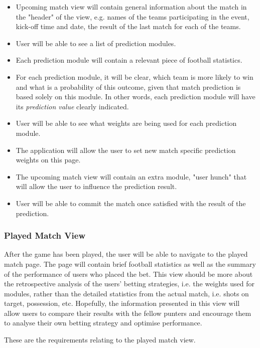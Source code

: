 \begin{itemize}
 \item Upcoming match view will contain general information about the match in the "header" of the view, e.g. names of the teams participating in the event, kick-off time and date, the result of the last match for each of the teams.
    \item User will be able to see a list of prediction modules.
    \item Each prediction module will contain a relevant piece of football statistics.
    \item For each prediction module, it will be clear, which team is more likely to win and what is a probability of this outcome, given that match prediction is based solely on this module. In other words, each prediction module will have its \emph{prediction value} clearly indicated.
    \item User will be able to see what weights are being used for each prediction module.
    \item The application will allow the user to set new match specific prediction weights on this page.
    \item The upcoming match view will contain an extra module, "user hunch" that will allow the user to influence the prediction result.
    \item User will be able to commit the match once satisfied with the result of the prediction.
\end{itemize}

\subsubsection{Played Match View}
\label{subsubsec:playedmatch_req}
After the game has been played, the user will be able to navigate to the played match page. The page will contain brief football statistics as well as the summary of the performance of users who placed the bet. This view should be more about the retrospective analysis of the users' betting strategies, i.e. the weights used for modules, rather than the detailed statistics from the actual match, i.e. shots on target, possession, etc. Hopefully, the information presented in this view will allow users to compare their results with the fellow punters and encourage them to analyse their own betting strategy and optimise performance.

These are the requirements relating to the played match view.

